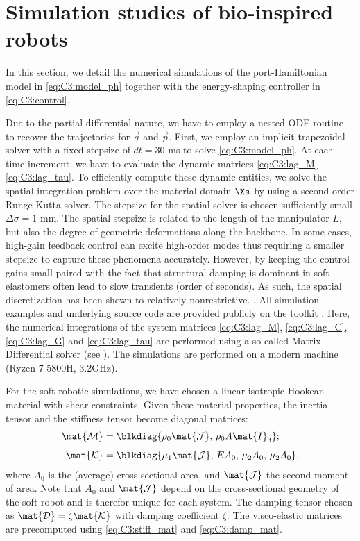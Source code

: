 \section{Simulation studies of bio-inspired robots} \label{sec:chap3_result}
In this section, we detail the numerical simulations of the port-Hamiltonian model in \eqref{eq:C3:model_ph} together with the energy-shaping controller in \eqref{eq:C3:control}. 

Due to the partial differential nature, we have to employ a nested ODE routine to recover the trajectories for $\vec{q}$ and $\vec{p}$. First, we employ an implicit trapezoidal solver with a fixed stepsize of $dt = 30 $ ms to solve \eqref{eq:C3:model_ph}. At each time increment, we have to evaluate the dynamic matrices \eqref{eq:C3:lag_M}-\eqref{eq:C3:lag_tau}. To efficiently compute these dynamic entities, we solve the spatial integration problem over the material domain $\Xs$ by using a second-order Runge-Kutta solver.  The stepsize for the spatial solver is chosen sufficiently small $\Delta \sigma = 1$ mm. The spatial stepsize is related to the length of the manipulator $L$, but also the degree of geometric deformations along the backbone. In some cases, high-gain feedback control can excite high-order modes thus requiring a smaller stepsize to capture these phenomena accurately. However, by keeping the control gains small paired with the fact that structural damping is dominant in soft elastomers often lead to slow transients (order of seconds). As such, the spatial discretization has been shown to relatively nonrestrictive. %
. All simulation examples and underlying source code are provided publicly on the \sorotoki toolkit \cite{Caasenbrood2020}. Here, the numerical integrations of the system matrices \eqref{eq:C3:lag_M}, \eqref{eq:C3:lag_C}, \eqref{eq:C3:lag_G} and \eqref{eq:C3:lag_tau} are performed using a so-called Matrix-Differential solver (see \cite{Caasenbrood2022}). The simulations are performed on a modern machine (Ryzen 7-5800H, 3.2GHz).

For the soft robotic simulations, we have chosen a linear isotropic Hookean material with shear constraints. %
Given these material properties, the inertia tensor and the stiffness tensor become diagonal matrices:
%
\begin{align*}
\mat{\mathcal{M}} & = \blkdiag{ \rho_0 \mat{\mathcal{J}},\, \rho_0 A \mat{I}_3}; \\[0.45em]
\mat{\mathcal{K}} & = \blkdiag{\mu_1 \mat{\mathcal{J}},\, E A_0,\, \mu_2  A_0,\,\mu_2  A_0},
\end{align*}
%
 where $A_0$ is the (average) cross-sectional area, and $\mat{\mathcal{J}}$ the second moment of area. Note that $A_0$ and $\mat{\mathcal{J}}$ depend on the cross-sectional geometry of the soft robot and is therefor unique for each system.  The damping tensor chosen as $\mat{\mathcal{D}} = \zeta \mat{\mathcal{K}}$ with damping coefficient $\zeta$. The visco-elastic matrices are precomputed using \eqref{eq:C3:stiff_mat} and \eqref{eq:C3:damp_mat}.

